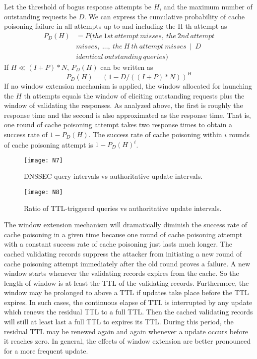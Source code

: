 \documentclass[conference]{IEEEtran}
\begin{document}
Let the threshold of bogus response attempts be $H$, and the maximum number of outstanding requests be $D$. We can express the cumulative probability of cache poisoning failure in all attempts up to and including the H th attempt as
\begin{equation}
\begin{aligned}
P_D(H)&=P(the~1st~attempt~misses,~the~2nd~attempt\\
&misses,~...,~the~H~th~attempt~misses~\mid~D\\
&identical~outstanding~queries)
\end{aligned}
\end{equation}
If $H\ll(I+P)*N$, $P_D(H)$ can be written as
\begin{equation}
P_D(H) = (1 - D / ((I+P)*N))^H
\end{equation}
If no window extension mechanism is applied, the window allocated for launching the $H$ th attempts equals the window of eliciting outstanding requests plus the window of validating the responses. As analyzed above, the first is roughly the response time and the second is also approximated as the response time. That is, one round of cache poisoning attempt takes two response times to obtain a success rate of $1-P_D(H)$. The success rate of cache poisoning within $i$ rounds of cache poisoning attempt is $1 - P_D(H)^i$.

\begin{figure}[!t]\begin{minipage}[t]{0.48\linewidth}
\centering
\texttt{[image: N7]}
\vspace{-1em}
\caption{DNSSEC query intervals vs authoritative update intervals.}
\vspace{-2em}
\end{minipage}
\hspace{0.3cm}
\begin{minipage}[t]{0.48\linewidth}
\centering
\texttt{[image: N8]}
\caption{Ratio of TTL-triggered queries vs authoritative update intervals.}
\vspace{-2em}
\end{minipage}
\end{figure}

The window extension mechanism will dramatically diminish the success rate of cache poisoning in a given time because one round of cache poisoning attempt with a constant success rate of cache poisoning just lasts much longer. The cached validating records suppress the attacker from initiating a new round of cache poisoning attempt immediately after the old round proves a failure. A new window starts whenever the validating records expires from the cache. So the length of window is at least the TTL of the validating records. Furthermore, the window may be prolonged to above a TTL if updates take place before the TTL expires. In such cases, the continuous elapse of TTL is interrupted by any update which renews the residual TTL to a full TTL. Then the cached validating records will still at least last a full TTL to expires its TTL. During this period, the residual TTL may be renewed again and again whenever a update occurs before it reaches zero. In general, the effects of window extension are better pronounced for a more frequent update.
\end{document}
